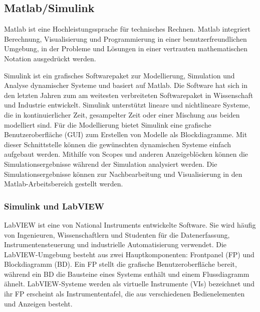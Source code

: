 


\subsection{Matlab/Simulink}

Matlab ist eine Hochleistungssprache für technisches Rechnen. Matlab integriert Berechnung, Visualisierung und Programmierung in einer benutzerfreundlichen Umgebung, in der Probleme und Lösungen in einer vertrauten mathematischen Notation ausgedrückt werden.

Simulink ist ein grafisches Softwarepaket zur Modellierung, Simulation und Analyse dynamischer Systeme und basiert auf Matlab. 
Die Software hat sich in den letzten Jahren zum am weitesten verbreiteten Softwarepaket in Wissenschaft und Industrie entwickelt.
Simulink unterstützt lineare und nichtlineare Systeme, die in kontinuierlicher Zeit, gesampelter Zeit oder einer Mischung aus beiden modelliert sind. Für die Modellierung bietet Simulink eine grafische Benutzeroberfläche (GUI) zum Erstellen von Modelle als Blockdiagramme. Mit dieser Schnittstelle können die gewünschten dynamischen Systeme einfach aufgebaut werden. Mithilfe von Scopes und anderen Anzeigeblöcken können die Simulationsergebnisse während der Simulation analysiert werden. Die Simulationsergebnisse können zur Nachbearbeitung und Visualisierung in den Matlab-Arbeitsbereich gestellt werden. \citep{Iov2004}\citep{Karris2008}\\



\subsubsection{Simulink und LabVIEW} 
LabVIEW ist eine von \glqq National Instruments\grqq{} entwickelte Software. Sie wird häufig von Ingenieuren, Wissenschaftlern und Studenten für die Datenerfassung, Instrumentensteuerung und industrielle Automatisierung verwendet. Die LabVIEW-Umgebung besteht aus zwei Hauptkomponenten: Frontpanel (FP) und Blockdiagramm (BD). Ein FP stellt die grafische Benutzeroberfläche bereit, während ein BD die Bausteine eines Systems enthält und einem Flussdiagramm ähnelt. LabVIEW-Systeme werden als virtuelle Instrumente (VIs) bezeichnet und ihr FP erscheint als Instrumententafel, die aus verschiedenen Bedienelementen und Anzeigen besteht.

